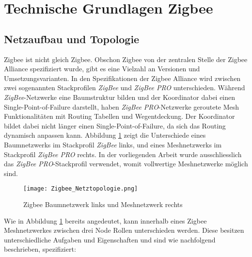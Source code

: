 \clearpage
\section{Technische Grundlagen Zigbee}\label{sec:TechnischeGrundlagenZigbee}

\subsection{Netzaufbau und Topologie}\label{subsec:ZigbeeNetzaufbauundTopologie}
Zigbee ist nicht gleich Zigbee.
Obschon Zigbee von der zentralen Stelle der Zigbee Alliance spezifiziert wurde, gibt es eine Vielzahl an Versionen und Umsetzungsvarianten.
In den Spezifikationen der Zigbee Alliance wird zwischen zwei sogenannten Stackprofilen \textit{ZigBee} und \textit{ZigBee PRO} unterschieden.
Während \textit{ZigBee}-Netzwerke eine Baumstruktur bilden und der Koordinator dabei einen Single-Point-of-Failure darstellt, haben \textit{ZigBee PRO}-Netzwerke geroutete Mesh Funktionalitäten mit Routing Tabellen und Wegentdeckung.
Der Koordinator bildet dabei nicht länger einen Single-Point-of-Failure, da sich das Routing dynamisch anpassen kann.
Abbildung \ref{fig:NetzwerktopologienZigbee} zeigt die Unterschiede eines Baumnetzwerks im Stackprofil \textit{ZigBee} links, und eines Meshnetzwerks im Stackprofil \textit{ZigBee PRO} rechts.
In der vorliegenden Arbeit wurde ausschliesslich das \textit{ZigBee PRO}-Stackprofil verwendet, womit vollwertige Meshnetzwerke möglich sind.

\begin{figure}[h]
	\centering
	\texttt{[image: Zigbee\_Netztopologie.png]}
	\caption{Zigbee Baumnetzwerk links und Meshnetzwerk rechts \cite[S.~221]{markus_krause_rainer_konrad_zigbee_2014}}	\label{fig:NetzwerktopologienZigbee}
\end{figure}

Wie in Abbildung \ref{fig:NetzwerktopologienZigbee} bereits angedeutet, kann innerhalb eines Zigbee Meshnetzwerkes zwischen drei Node Rollen unterschieden werden. Diese besitzen unterschiedliche Aufgaben und Eigenschaften und sind wie nachfolgend beschrieben, spezifiziert:

